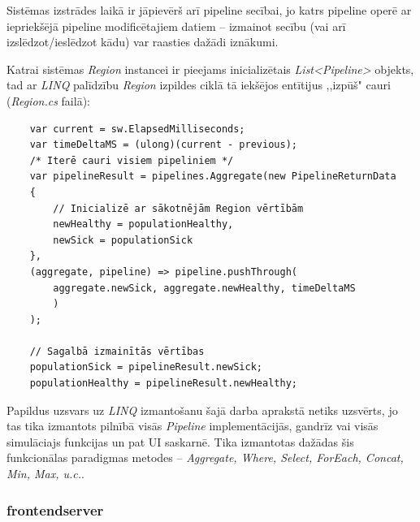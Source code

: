 Sistēmas izstrādes laikā ir jāpievērš arī pipeline secībai, jo katrs pipeline
operē ar iepriekšējā pipeline modificētajiem datiem -- izmainot secību
(vai arī izslēdzot/ieslēdzot kādu) var raasties dažādi iznākumi.

Katrai sistēmas \emph{Region} instancei ir pieejams inicializētais \emph{List<Pipeline>}
objekts, tad ar \emph{LINQ} palīdzību \emph{Region} izpildes ciklā tā iekšējos entītijus
,,izpūš" cauri (\emph{Region.cs} failā):

{
\begin{verbatim}
    var current = sw.ElapsedMilliseconds;
    var timeDeltaMS = (ulong)(current - previous);
    /* Iterē cauri visiem pipeliniem */
    var pipelineResult = pipelines.Aggregate(new PipelineReturnData
    {
        // Inicializē ar sākotnējām Region vērtībām
        newHealthy = populationHealthy,
        newSick = populationSick
    },
    (aggregate, pipeline) => pipeline.pushThrough(
        aggregate.newSick, aggregate.newHealthy, timeDeltaMS
        )
    );

    // Sagalbā izmainītās vērtības
    populationSick = pipelineResult.newSick;
    populationHealthy = pipelineResult.newHealthy;
\end{verbatim}
}

Papildus uzsvars uz \emph{LINQ} izmantošanu šajā darba aprakstā netiks uzsvērts,
jo tas tika izmantots pilnībā visās \emph{Pipeline} implementācijās, gandrīz vai
visās simulāciajs funkcijas un pat UI saskarnē. Tika izmantotas dažādas šis
funkcionālas paradigmas metodes -- \emph{Aggregate, Where, Select, ForEach, Concat, Min, Max, u.c.}.


\subsubsection{frontendserver}

